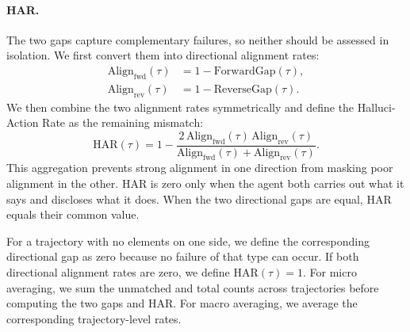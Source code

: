 \paragraph{\textbf{HAR}.}
The two gaps capture complementary failures, so neither should be assessed
in isolation. We first convert them into directional alignment rates:
\begin{equation}
\begin{aligned}
\mathrm{Align}_{\mathrm{fwd}}(\tau)
&= 1-\mathrm{ForwardGap}(\tau),\\
\mathrm{Align}_{\mathrm{rev}}(\tau)
&= 1-\mathrm{ReverseGap}(\tau).
\end{aligned}
\end{equation}
We then combine the two alignment rates symmetrically and define the
Halluci-Action Rate as the remaining mismatch:
\begin{equation}
\mathrm{HAR}(\tau)
=
1-
\frac{
2\,
\mathrm{Align}_{\mathrm{fwd}}(\tau)\,
\mathrm{Align}_{\mathrm{rev}}(\tau)
}{
\mathrm{Align}_{\mathrm{fwd}}(\tau)
+
\mathrm{Align}_{\mathrm{rev}}(\tau)
}.
\label{eq:har}
\end{equation}
This aggregation prevents strong alignment in one direction from masking
poor alignment in the other. HAR is zero only when the agent both carries
out what it says and discloses what it does. When the two directional gaps
are equal, HAR equals their common value.

For a trajectory with no elements on one side, we define the corresponding
directional gap as zero because no failure of that type can occur. If both
directional alignment rates are zero, we define $\mathrm{HAR}(\tau)=1$.
For micro averaging, we sum the unmatched and total counts across
trajectories before computing the two gaps and HAR. For macro averaging, we
average the corresponding trajectory-level rates.

